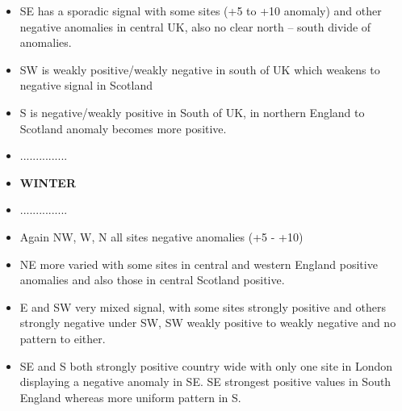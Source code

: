 \documentclass[10pt]{article}
\begin{document}
\begin{itemize}
\item SE has a sporadic signal with some sites (+5 to +10 anomaly) and other negative anomalies in central UK, also no clear north – south divide of anomalies. 
\item SW is weakly positive/weakly negative in south of UK which weakens to negative signal in Scotland 
\item S is negative/weakly positive in South of UK, in northern England to Scotland anomaly becomes more positive.
\item ...............
\item \textbf{WINTER}
\item ...............
\item Again NW, W, N all sites negative anomalies (+5 - +10)
\item NE more varied with some sites in central and western England positive anomalies and also those in central Scotland positive. 
\item E and SW very mixed signal, with some sites strongly positive and others strongly negative under SW, SW weakly positive to weakly negative and no pattern to either.
\item SE and S both strongly positive country wide with only one site in London displaying a negative anomaly in SE. SE strongest positive values in South England whereas more uniform pattern in S. 
\end{itemize}
\end{document}

